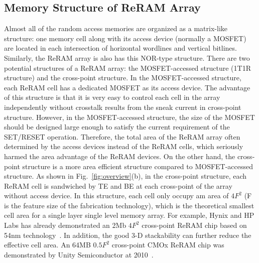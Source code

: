 \subsection{Memory Structure of ReRAM Array}

Almost all of the random access memories are organized as a matrix-like structure: one memory cell along with its access device (normally a MOSFET) are located in each intersection of horizontal wordlines and vertical bitlines. Similarly, the ReRAM array is also has this NOR-type structure. There are two potential structures of a ReRAM array: the MOSFET-accessed structure (1T1R structure) and the cross-point structure. In the MOSFET-accessed structure, each ReRAM cell has a dedicated MOSFET as its access device. The advantage of this structure is that it is very easy to control each cell in the array independently without crosstalk results from the sneak current in cross-point structure. However, in the MOSFET-accessed structure, the size of the MOSFET should be designed large enough to satisfy the current requirement of the SET/RESET operation. Therefore, the total area of the ReRAM array often determined by the access devices instead of the ReRAM cells, which seriously harmed the area advantage of the ReRAM devices. On the other hand, the cross-point structure is a more area efficient structure compared to MOSFET-accessed structure. As shown in Fig.~\ref{fig:overview}(b), in the cross-point structure, each ReRAM cell is sandwiched by TE and BE at each cross-point of the array without access device. In this structure, each cell only occupy am area of $4F^2$ (F is the feature size of the fabrication technology), which is the theoretical smallest cell area for a single layer single level memory array. For example, Hynix and HP Labs has already demonstrated an 2Mb $4F^2$ cross-point ReRAM chip based on 54nm technology~\cite{TiTa}. In addition, the good 3-D stackability can further reduce the effective cell area. An 64MB $0.5F^2$ cross-point CMOx ReRAM chip was demonstrated by Unity Semiconductor at 2010~\cite{Unity}.


